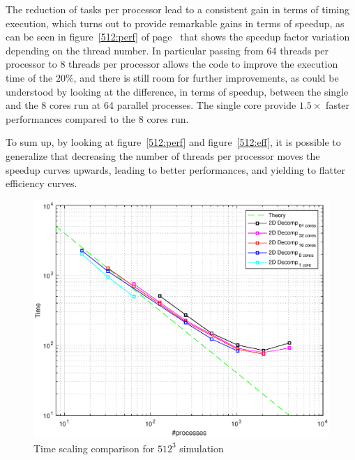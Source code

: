 \par
The reduction of tasks per processor lead to a consistent gain in terms of timing execution, which turns out to provide remarkable gains in terms of speedup, as can be seen in figure~\ref{512:perf} of page~\pageref{512:perf} that shows the speedup factor variation depending on the thread number. In particular passing from 64 threads per processor to 8 threads per processor allows the code to improve the execution time of the $20\%$, and there is still room for further improvements, as could be understood by looking at the difference, in terms of speedup, between the single and the 8 cores run at 64 parallel processes. The single core provide $1.5\times$ faster performances compared to the 8 cores run. \\
\par
To sum up, by looking at figure~\ref{512:perf} and figure~\ref{512:eff}, it is possible to generalize that decreasing the number of threads per processor moves the speedup curves upwards, leading to better performances, and yielding to flatter efficiency curves.


\begin{figure}
\begin{center}
\includegraphics[scale=0.6]{grafici/5124}
\caption{Time scaling comparison for $512^3$ simulation}
\label{512:times}
\end{center}
\end{figure}

